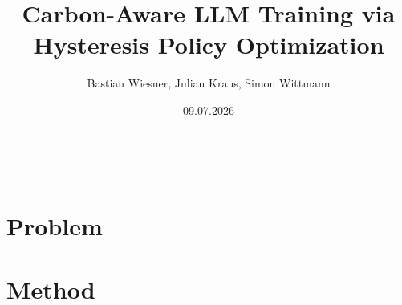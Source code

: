 \documentclass[final]{beamer}
\title[Carbon-Aware LLM Training]{Carbon-Aware LLM Training
via\\Hysteresis Policy Optimization}
\author[TheGreenEpoch]{
  Bastian Wiesner, Julian Kraus, Simon Wittmann
}
\institute[FAU]{
  Friedrich-Alexander-Universit\"at Erlangen-N\"urnberg, Computer Science 7
}
\date{09.07.2026}
\begin{document}
\begin{frame}[t,titleimagenofooter]{-}
  \titlepage
\end{frame}

\section{Problem}







%


%

\section{Method}







%

\end{document}
